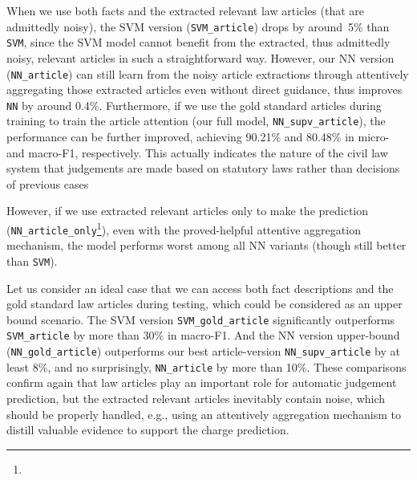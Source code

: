 When we use both facts and the extracted relevant law articles (that are admittedly noisy),  
the SVM version (\texttt{SVM\_article}) drops by around~5\% than \texttt{SVM}, since the SVM model 
cannot benefit from the extracted, thus admittedly noisy, relevant articles in such a straightforward way. 
However, our NN version (\texttt{NN\_article}) can still learn from  the noisy article extractions through 
attentively aggregating those extracted articles even without direct guidance, 
thus improves \texttt{NN} by around 0.4\%. 
Furthermore, if we use the gold standard articles during training to  train the 
article attention (our full model, \texttt{NN\_supv\_article}), the performance can be further improved, achieving 
90.21\% and 80.48\% in micro- and macro-F1, respectively.
This actually indicates the nature of the civil law system that judgements are made based on statutory laws rather than decisions of previous cases

However,  if we use extracted relevant articles only to make the prediction (\texttt{NN\_article\_only}\footnote{ 
}),
even with the proved-helpful attentive aggregation mechanism, the model performs worst among all NN
variants (though still better than \texttt{SVM}). 


Let us consider an ideal case that we can access both fact descriptions and the gold standard law articles during testing, which could be considered as an upper bound scenario.  
The SVM version \texttt{SVM\_gold\_article} significantly outperforms %
  \texttt{SVM\_article} by more than 30\% in macro-F1. 
And the NN version upper-bound (\texttt{NN\_gold\_article}) outperforms
our best article-version \texttt{NN\_supv\_article} by at least 8\%, and no surprisingly, \texttt{NN\_article} by more than 10\%.
%
These comparisons confirm again that
 law articles play an important role for automatic judgement prediction, but
the extracted relevant articles inevitably contain noise, which should be properly 
handled, e.g., using an attentively aggregation mechanism to distill 
valuable evidence to support the charge prediction. 



